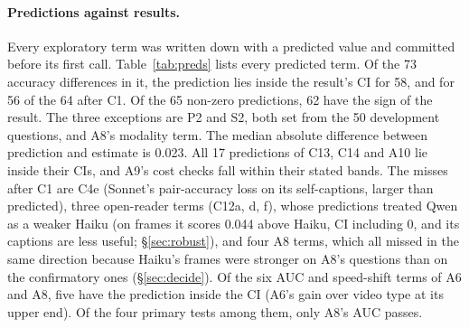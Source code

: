 \documentclass[11pt]{article}
\begin{document}
\paragraph{Predictions against results.} Every exploratory term was written down with a predicted value and committed before its first call. Table~\ref{tab:preds} lists every predicted term. Of the 73 accuracy differences in it, the prediction lies inside the result's CI for 58, and for 56 of the 64 after C1. Of the 65 non-zero predictions, 62 have the sign of the result. The three exceptions are P2 and S2, both set from the 50 development questions, and A8's modality term. The median absolute difference between prediction and estimate is 0.023. All 17 predictions of C13, C14 and A10 lie inside their CIs, and A9's cost checks fall within their stated bands. The misses after C1 are C4e (Sonnet's pair-accuracy loss on its self-captions, larger than predicted), three open-reader terms (C12a, d, f), whose predictions treated Qwen as a weaker Haiku (on frames it scores 0.044 above Haiku, CI including 0, and its captions are less useful; \S\ref{sec:robust}), and four A8 terms, which all missed in the same direction because Haiku's frames were stronger on A8's questions than on the confirmatory ones (\S\ref{sec:decide}). Of the six AUC and speed-shift terms of A6 and A8, five have the prediction inside the CI (A6's gain over video type at its upper end). Of the four primary tests among them, only A8's AUC passes.
\end{document}
